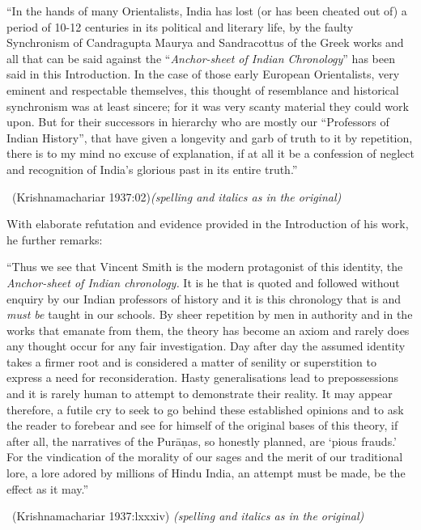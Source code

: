 \begin{myquote}
“In the hands of many Orientalists, India has lost (or has been cheated out of) a period of 10-12 centuries in its political and literary life, by the faulty Synchronism of Candragupta Maurya and Sandracottus of the Greek works and all that can be said against the “\textit{Anchor-sheet of Indian Chronology}” has been said in this Introduction. In the case of those early European Orientalists, very eminent and respectable themselves, this thought of resemblance and historical synchronism was at least sincere; for it was very scanty material they could work upon. But for their successors in hierarchy who are mostly our “Professors of Indian History”, that have given a longevity and garb of truth to it by repetition, there is to my mind no excuse of explanation, if at all it be a confession of neglect and recognition of India’s glorious past in its entire truth.” 

~\hfill (Krishnamachariar 1937:02)\textit{(spelling and italics as in the original)}
\end{myquote}

With elaborate refutation and evidence provided in the Introduction of his work, he further remarks:

\begin{myquote}
“Thus we see that Vincent Smith is the modern protagonist of this identity, the \textit{Anchor-sheet of Indian chronology.} It is he that is quoted and followed without enquiry by our Indian professors of history and it is this chronology that is and \textit{must be} taught in our schools. By sheer repetition by men in authority and in the works that emanate from them, the theory has become an axiom and rarely does any thought occur for any fair investigation. Day after day the assumed identity takes a firmer root and is considered a matter of senility or superstition to express a need for reconsideration. Hasty generalisations lead to prepossessions and it is rarely human to attempt to demonstrate their reality. It may appear therefore, a futile cry to seek to go behind these established opinions and to ask the reader to forebear and see for himself of the original bases of this theory, if after all, the narratives of the Purāṇas, so honestly planned, are ‘pious frauds.’ For the vindication of the morality of our sages and the merit of our traditional lore, a lore adored by millions of Hindu India, an attempt must be made, be the effect as it may.” 

~\hfill (Krishnamachariar 1937:lxxxiv) \textit{(spelling and italics as in the original)}
\end{myquote}

